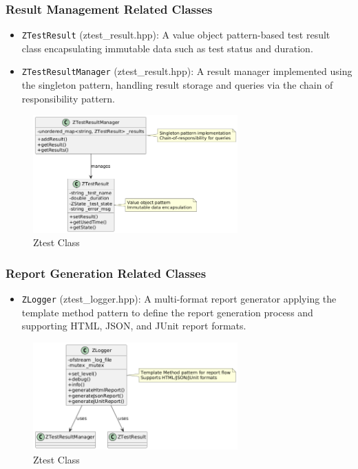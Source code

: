 \documentclass{article}
\begin{document}
\subsubsection{Result Management Related Classes}
\begin{itemize}
    \item \texttt{ZTestResult} (ztest\_result.hpp): A value object pattern-based test result class encapsulating immutable data such as test status and duration.
    \item \texttt{ZTestResultManager} (ztest\_result.hpp): A result manager implemented using the singleton pattern, handling result storage and queries via the chain of responsibility pattern.
\end{itemize}
\begin{figure}[H]
    \centering
    \includegraphics[width = 0.7\textwidth]{img/c5.png} %
    \caption{ Ztest Class}
    \label{fig:ztest class }
\end{figure}
\subsubsection{Report Generation Related Classes}
\begin{itemize}
    \item \texttt{ZLogger} (ztest\_logger.hpp): A multi-format report generator applying the template method pattern to define the report generation process and supporting HTML, JSON, and JUnit report formats.
\end{itemize}
\begin{figure}[H]
    \centering
    \includegraphics[width =0.7\textwidth]{img/c6.png} %
    \caption{ Ztest Class}
    \label{fig:ztest class }
\end{figure}
\end{document}
